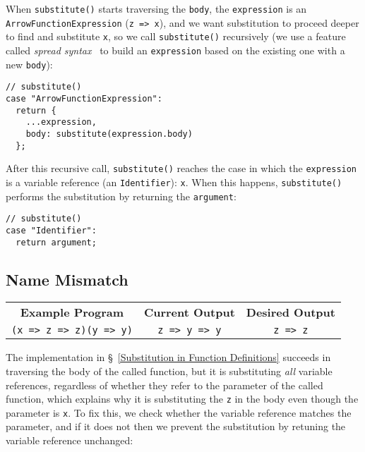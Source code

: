 \documentclass[12pt, oneside]{book}
\begin{document}
When \texttt{substitute()} starts traversing the \texttt{body}, the \texttt{expression} is an \texttt{ArrowFunctionExpression} (\texttt{z => x}), and we want substitution to proceed deeper to find and substitute \texttt{x}, so we call \texttt{substitute()} recursively (we use a feature called \emph{spread syntax}~\cite{spread-syntax} to build an \texttt{expression} based on the existing one with a new \texttt{body}):

\begin{verbatim}
// substitute()
case "ArrowFunctionExpression":
  return {
    ...expression,
    body: substitute(expression.body)
  };
\end{verbatim}

After this recursive call, \texttt{substitute()} reaches the case in which the \texttt{expression} is a variable reference (an \texttt{Identifier}): \texttt{x}. When this happens, \texttt{substitute()} performs the substitution by returning the \texttt{argument}:

\begin{verbatim}
// substitute()
case "Identifier":
  return argument;
\end{verbatim}

\subsection{Name Mismatch}

\begin{center}
\begin{tabular}{c|c|c}
\textbf{Example Program} & \textbf{Current Output} & \textbf{Desired Output} \\
\texttt{(x => z => z)(y => y)} & \texttt{z => y => y} & \texttt{z => z} \\
\end{tabular}
\end{center}

\noindent The implementation in §~\ref{Substitution in Function Definitions} succeeds in traversing the body of the called function, but it is substituting \emph{all} variable references, regardless of whether they refer to the parameter of the called function, which explains why it is substituting the \texttt{z} in the body even though the parameter is \texttt{x}. To fix this, we check whether the variable reference matches the parameter, and if it does not then we prevent the substitution by retuning the variable reference unchanged:
\end{document}

